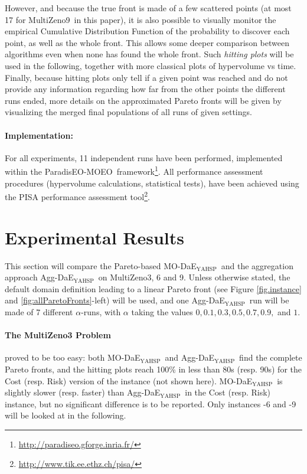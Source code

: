\documentclass{llncs}
\def\PARADISEO{{\sc ParadisEO-MOEO}}
\def\MULTIZENO{{\sc MultiZeno}}
\def\MODAEYAHSP{{\sc MO-DaE$_{\text{YAHSP}}$}}
\def\AGGDAEYAHSP{{\sc Agg-DaE$_{\text{YAHSP}}$}}
\begin{document}
However, and because the true front is made of a few scattered points (at most 17 for \MULTIZENO9\ in this paper), it is also possible to visually monitor the empirical Cumulative Distribution Function of the probability to discover each point, as well as the whole front. This allows some deeper comparison between algorithms even when none has found the whole front. Such {\em hitting plots} will be used in the following, together with more classical plots of hypervolume vs time.
Finally, because hitting plots only tell if a given point was reached and do not provide any information regarding how far from the other points the different runs ended, more details on the approximated Pareto fronts will be given by visualizing the merged final populations of all runs of given settings.

\paragraph{Implementation:} For all experiments, 11 independent runs have been performed, implemented within the \PARADISEO\ framework\footnote{\url{http://paradiseo.gforge.inria.fr/}}. All performance assessment procedures (hypervolume calculations, statistical tests), have been achieved using the PISA performance assessment tool\footnote{\url{http://www.tik.ee.ethz.ch/pisa/}}.

\section{Experimental Results}
\label{sec:results}
This section will compare the Pareto-based \MODAEYAHSP\ and the aggregation approach \AGGDAEYAHSP\ on \MULTIZENO3, 6 and 9. Unless otherwise stated, the default domain definition leading to a linear Pareto front (see Figure \ref{fig.instance} and \ref{fig:allParetoFronts}-left) will be used, and one \AGGDAEYAHSP\ run will be made of 7 different $\alpha$-runs, with $\alpha$ taking the values $0, 0.1, 0.3, 0.5, 0.7, 0.9,$ and $1$.

\paragraph{The MultiZeno3 Problem} proved to be too easy: both \MODAEYAHSP\ and \AGGDAEYAHSP\ find the complete Pareto fronts, and the hitting plots reach 100\% in less than 80s (resp. 90s) for the {\sc Cost} (resp. {\sc Risk}) version of the instance (not shown here). \MODAEYAHSP\ is slightly slower (resp. faster) than \AGGDAEYAHSP\ in the {\sc Cost} (resp. {\sc Risk}) instance, but no significant difference is to be reported. Only instances -6 and -9 will be looked at in the following.
\end{document}
